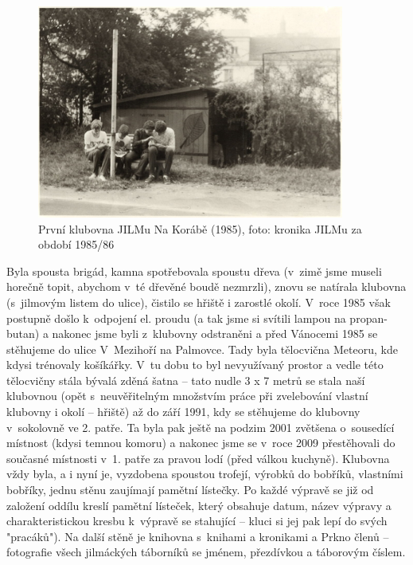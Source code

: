 \documentclass[a5paper, 11pt, twoside]{article}
\begin{document}
\begin{figure}[h]
  \centering 
  \includegraphics[width=0.9\textwidth]{img/77_klubovna_jilm.jpg}
  \caption*{První klubovna JILMu Na Korábě (1985), foto: kronika JILMu za
  období 1985/86}
\end{figure}

Byla spousta brigád, kamna spotřebovala spoustu dřeva (v~zimě jsme
museli horečně topit, abychom v~té dřevěné boudě nezmrzli), znovu se
natírala klubovna (s~jilmovým listem do ulice), čistilo se hřiště i
zarostlé okolí. V~roce 1985 však postupně došlo k~odpojení el. proudu (a
tak jsme si svítili lampou na propan-butan) a nakonec jsme byli
z~klubovny odstraněni a před Vánocemi 1985 se stěhujeme do ulice
V~Mezihoří na Palmovce. Tady byla tělocvična Meteoru, kde kdysi trénovaly
košíkářky. V~tu dobu to byl nevyužívaný prostor a vedle této tělocvičny
stála bývalá zděná šatna -- tato nudle 3 x 7 metrů se stala naší
klubovnou (opět s~neuvěřitelným množstvím práce při zvelebování vlastní
klubovny i okolí -- hřiště) až do září 1991, kdy se stěhujeme do
klubovny v~sokolovně ve 2. patře. Ta byla pak ještě na podzim 2001
zvětšena o~sousedící místnost (kdysi temnou komoru) a nakonec jsme se
v~roce 2009 přestěhovali do současné místnosti v~1. patře za pravou lodí
(před válkou kuchyně). Klubovna vždy byla, a i nyní je, vyzdobena
spoustou trofejí, výrobků do bobříků, vlastními bobříky, jednu stěnu
zaujímají pamětní lístečky. Po každé výpravě se již od založení oddílu
kreslí pamětní lísteček, který obsahuje datum, název výpravy a
charakteristickou kresbu k~výpravě se stahující -- kluci si jej pak lepí
do svých "pracáků"). Na další stěně je knihovna s~knihami a kronikami a
Prkno členů -- fotografie všech jilmáckých táborníků se jménem,
přezdívkou a táborovým číslem.
\end{document}
